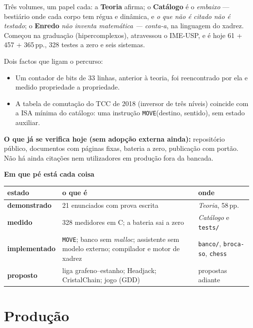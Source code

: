 \documentclass[11pt,a4paper]{article}
\newcommand{\lin}[2]{\noindent\textbf{#1}\hfill{\color{cinza}\small #2}\par}
\begin{document}
\smallskip
Três volumes, um papel cada: a \textbf{Teoria} afirma; o \textbf{Catálogo} é o
\emph{embaixo} --- bestiário onde cada corpo tem régua e dinâmica, e
\emph{o que não é citado não é testado}; o \textbf{Enredo} \emph{não inventa matemática ---
conta-a}, na linguagem do xadrez. Começou na graduação (hipercomplexos), atravessou o
IME-USP, e é hoje 61 + 457 + 365\,pp., 328 testes a zero e seis sistemas.

\smallskip
Dois factos que ligam o percurso:
\begin{itemize}
\item Um contador de bits de 33 linhas, anterior à teoria, foi reencontrado por ela e medido
propriedade a propriedade.
\item A tabela de comutação do TCC de 2018 (inversor de três níveis) coincide com a ISA
mínima do catálogo: uma instrução \texttt{MOVE}(destino, sentido), sem estado auxiliar.
\end{itemize}

\smallskip
\noindent\textbf{O que já se verifica hoje (sem adopção externa ainda):}
repositório público, documentos com páginas fixas, bateria a zero, publicação com portão.
Não há ainda citações nem utilizadores em produção fora da bancada.

\lin{Em que pé está cada coisa}{}

\begin{center}\footnotesize
\begin{tabular}{@{}p{2.5cm}p{7.6cm}p{4.4cm}@{}}
\toprule
\textbf{estado} & \textbf{o que é} & \textbf{onde} \\
\midrule
\textbf{demonstrado} &
21 enunciados com prova escrita &
\emph{Teoria}, 58\,pp. \\[2pt]
\textbf{medido} &
328 medidores em C; a bateria sai a zero &
\emph{Catálogo} e \texttt{tests/} \\[2pt]
\textbf{implementado} &
\texttt{MOVE}; banco sem \emph{malloc}; assistente sem modelo
externo; compilador e motor de xadrez &
\texttt{banco/}, \texttt{broca-so}, \texttt{chess} \\[2pt]
\textbf{proposto} &
liga grafeno--estanho; Headjack; CristalChain; jogo (GDD) &
propostas adiante \\
\bottomrule
\end{tabular}
\end{center}

\section*{Produção}
\end{document}
